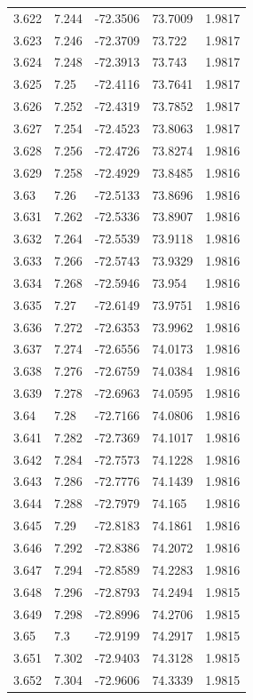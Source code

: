 \begin{tabular}{lllll}
3.622 & 7.244 & -72.3506 & 73.7009 & 1.9817 \\
3.623 & 7.246 & -72.3709 & 73.722 & 1.9817 \\
3.624 & 7.248 & -72.3913 & 73.743 & 1.9817 \\
3.625 & 7.25 & -72.4116 & 73.7641 & 1.9817 \\
3.626 & 7.252 & -72.4319 & 73.7852 & 1.9817 \\
3.627 & 7.254 & -72.4523 & 73.8063 & 1.9817 \\
3.628 & 7.256 & -72.4726 & 73.8274 & 1.9816 \\
3.629 & 7.258 & -72.4929 & 73.8485 & 1.9816 \\
3.63 & 7.26 & -72.5133 & 73.8696 & 1.9816 \\
3.631 & 7.262 & -72.5336 & 73.8907 & 1.9816 \\
3.632 & 7.264 & -72.5539 & 73.9118 & 1.9816 \\
3.633 & 7.266 & -72.5743 & 73.9329 & 1.9816 \\
3.634 & 7.268 & -72.5946 & 73.954 & 1.9816 \\
3.635 & 7.27 & -72.6149 & 73.9751 & 1.9816 \\
3.636 & 7.272 & -72.6353 & 73.9962 & 1.9816 \\
3.637 & 7.274 & -72.6556 & 74.0173 & 1.9816 \\
3.638 & 7.276 & -72.6759 & 74.0384 & 1.9816 \\
3.639 & 7.278 & -72.6963 & 74.0595 & 1.9816 \\
3.64 & 7.28 & -72.7166 & 74.0806 & 1.9816 \\
3.641 & 7.282 & -72.7369 & 74.1017 & 1.9816 \\
3.642 & 7.284 & -72.7573 & 74.1228 & 1.9816 \\
3.643 & 7.286 & -72.7776 & 74.1439 & 1.9816 \\
3.644 & 7.288 & -72.7979 & 74.165 & 1.9816 \\
3.645 & 7.29 & -72.8183 & 74.1861 & 1.9816 \\
3.646 & 7.292 & -72.8386 & 74.2072 & 1.9816 \\
3.647 & 7.294 & -72.8589 & 74.2283 & 1.9816 \\
3.648 & 7.296 & -72.8793 & 74.2494 & 1.9815 \\
3.649 & 7.298 & -72.8996 & 74.2706 & 1.9815 \\
3.65 & 7.3 & -72.9199 & 74.2917 & 1.9815 \\
3.651 & 7.302 & -72.9403 & 74.3128 & 1.9815 \\
3.652 & 7.304 & -72.9606 & 74.3339 & 1.9815 \\

\end{tabular}
